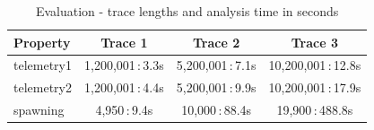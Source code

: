 

\begin{table}[h!]
\centering
\begin{tabular}{|l|c|c|c|}
\hline
Property   & Trace 1 & Trace 2 & Trace 3 \\
\hline
telemetry1 & 1,200,001\,:\,3.3s & 5,200,001\,:\,7.1s & 10,200,001\,:\,12.8s \\
\hline
telemetry2 & 1,200,001\,:\,4.4s & 5,200,001\,:\,9.9s & 10,200,001\,:\,17.9s \\
\hline
spawning   & 4,950\,:\,9.4s & 10,000\,:\,88.4s & 19,900\,:\,488.8s \\
\hline
\end{tabular}
\caption{Evaluation - trace lengths and analysis time in seconds}
\label{tab:evaluation}
\end{table}


